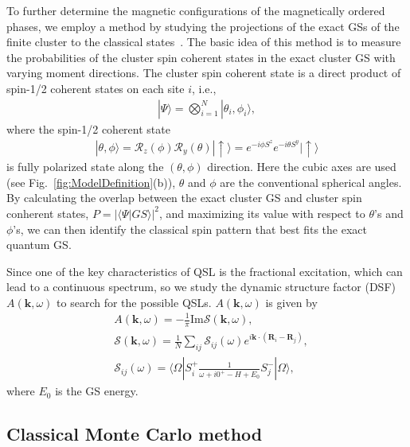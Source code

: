\documentclass[aps,prb,reprint,amsfonts,amsmath,amssymb,showpacs,groupedaddress,superscriptaddress]{revtex4-1}
\begin{document}
To further determine the magnetic configurations of the magnetically ordered phases, we employ a method by studying the projections of the exact GSs of the finite cluster to the classical states~\cite{PhysRevB.94.064435}. The basic idea of this method is to measure the probabilities of the cluster spin coherent states in the exact cluster GS with varying moment directions. The cluster spin coherent state is a direct product of spin-1/2 coherent states on each site $i$, i.e.,
\begin{align}
    | \Psi \rangle = \bigotimes_{i=1}^{N} | \theta_{i}, \phi_{i} \rangle,
    \label{eq:ClusterCoherentState}
\end{align}
where the spin-1/2 coherent state
\begin{align}
    | \theta, \phi \rangle = \mathcal{R}_{z}(\phi) \mathcal{R}_{y}(\theta) | \uparrow \rangle = e^{-i \phi S^z} e^{-i \theta S^y} | \uparrow \rangle
    \label{eq:Spin-1/2CoherentState}
\end{align}
is fully polarized state along the $(\theta, \phi)$ direction. Here the cubic axes are used (see Fig.~\ref{fig:ModelDefinition}(b)), $\theta$ and $\phi$ are the conventional spherical angles. By calculating the overlap between the exact cluster GS and cluster spin conherent states, $P = | \langle \Psi | GS \rangle |^2$, and maximizing its value with respect to $\theta$'s and $\phi$'s, we can then identify the classical spin pattern that best fits the exact quantum GS.

Since one of the key characteristics of QSL is the fractional excitation, which can lead to a continuous spectrum, so we study the dynamic structure factor (DSF) $A(\bm{k}, \omega)$ to search for the possible QSLs. $A(\bm{k}, \omega)$ is given by
\begin{align}
    & A(\bm{k}, \omega) = -\frac{1}{\pi} \text{Im} \mathcal{S}(\bm{k}, \omega), \label{eq:Akomega} \\
    & \mathcal{S}(\bm{k}, \omega) = \frac{1}{N} \sum_{ij} \mathcal{S}_{ij}(\omega) e^{i \bm{k} \cdot (\bm{R}_i - \bm{R}_j)}, \\
    & \mathcal{S}_{ij}(\omega) = \langle \Omega | S_i^{+} \frac{1}{\omega + i0^{+} - H + E_0} S_j^{-} | \Omega \rangle, \label{eq:GreenFunction}
\end{align}
where $E_0$ is the GS energy.

\subsection{\label{subsec:MethodMC}Classical Monte Carlo method}
\end{document}
